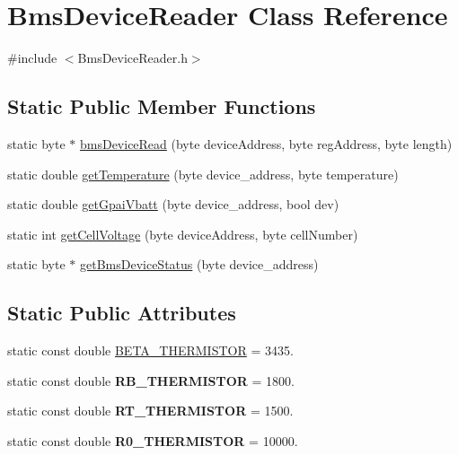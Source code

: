 \hypertarget{class_bms_device_reader}{}\section{Bms\+Device\+Reader Class Reference}
\label{class_bms_device_reader}


{\ttfamily \#include $<$Bms\+Device\+Reader.\+h$>$}

\subsection*{Static Public Member Functions}
\begin{DoxyCompactItemize}
\item 
static byte $\ast$ \hyperlink{class_bms_device_reader_af56a2eaeb612587f91b9271ffaf8cda0}{bms\+Device\+Read} (byte device\+Address, byte reg\+Address, byte length)
\item 
static double \hyperlink{class_bms_device_reader_ad3a3a7bb7cae1e3a69f092004cb533ed}{get\+Temperature} (byte device\+\_\+address, byte temperature)
\item 
static double \hyperlink{class_bms_device_reader_a1f0651bfef7b2235825320e1e96993a0}{get\+Gpai\+Vbatt} (byte device\+\_\+address, bool dev)
\item 
static int \hyperlink{class_bms_device_reader_abcc5341d72ed906225e85b5faa5cf6e8}{get\+Cell\+Voltage} (byte device\+Address, byte cell\+Number)
\item 
static byte $\ast$ \hyperlink{class_bms_device_reader_a824d04ae77bd18902c1445980fe9dc3a}{get\+Bms\+Device\+Status} (byte device\+\_\+address)
\end{DoxyCompactItemize}
\subsection*{Static Public Attributes}
\begin{DoxyCompactItemize}
\item 
static const double \hyperlink{class_bms_device_reader_a00678a97467753d00db7f52209652bb9}{B\+E\+T\+A\+\_\+\+T\+H\+E\+R\+M\+I\+S\+T\+OR} = 3435.
\item 
static const double {\bfseries R\+B\+\_\+\+T\+H\+E\+R\+M\+I\+S\+T\+OR} = 1800.\hypertarget{class_bms_device_reader_a690fcc9572eec59496f5815d5ad96868}{}\label{class_bms_device_reader_a690fcc9572eec59496f5815d5ad96868}

\item 
static const double {\bfseries R\+T\+\_\+\+T\+H\+E\+R\+M\+I\+S\+T\+OR} = 1500.\hypertarget{class_bms_device_reader_afb697685241c1c09748834cbbc182577}{}\label{class_bms_device_reader_afb697685241c1c09748834cbbc182577}

\item 
static const double {\bfseries R0\+\_\+\+T\+H\+E\+R\+M\+I\+S\+T\+OR} = 10000.\hypertarget{class_bms_device_reader_a80aebbbaaa3fbd33df82d70c185fb738}{}\label{class_bms_device_reader_a80aebbbaaa3fbd33df82d70c185fb738}

\end{DoxyCompactItemize}


